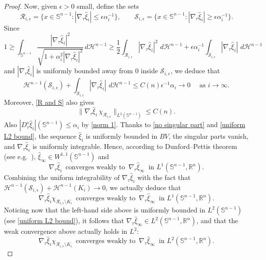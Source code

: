 \documentclass[reqno,11pt]{amsart}
\def\ez{\epsilon}
\numberwithin{equation}{section}
\theoremstyle{remark}
\begin{document}
\begin{proof}
Now, given  $\ez>0$ small, define the sets
$$\mathcal R_{i,\ez}=\{x\in \mathbb S^{n-1}\colon |\nabla_\tau \hat \xi_i|\le \ez\alpha_i^{-1}\}, \qquad \mathcal S_{i,\ez}=\{x\in \mathbb S^{n-1}\colon |\nabla_\tau \hat \xi_i|\ge \ez\alpha_i^{-1}\}.$$
Since
\begin{equation}\label{R and S}
  1\ge  \int_{\mathbb S^{n-1}}  \frac{|\nabla_\tau \hat \xi_i|^2}{\sqrt{1+ \alpha_i^2|\nabla_\tau \hat \xi_i|^2}} \,d\mathscr H^{n-1}\ge \frac 1 2 \int_{\mathcal R_{i,\ez}} |\nabla_\tau \hat \xi_i|^2\, \,d\mathscr H^{n-1} +\ez \alpha_i^{-1} \int_{\mathcal S_{i,\ez}} |\nabla_\tau \hat \xi_i|\, \,d\mathscr H^{n-1}
\end{equation} 
and $|\nabla_\tau \hat \xi_i|$ is uniformly bounded away from $0$ inside $\mathcal S_{i,\ez}$, we deduce that 
\begin{equation}\label{no singular part}
\mathscr H^{n-1}(\mathcal S_{i,\ez})+  \int_{\mathcal S_{i,\ez}} |\nabla_\tau \hat \xi_i|\, \,d\mathscr H^{n-1}\le C(n) \ez^{-1}\alpha_i \to 0 \quad \text{ as }i \to \infty. 
\end{equation}
Moreover, \eqref{R and S} also gives
\begin{equation}\label{uniform L2 bound}
    \|\nabla_\tau \hat \xi_i\,\chi_{\mathcal R_{i,\ez}}\|_{L^2(\mathbb S^{n-1})}\le C(n).
\end{equation} 
Also $|D^s_\tau\hat\xi_i|(\mathbb S^{n-1})\le \alpha_i$ by \eqref{norm 1}.
Thanks to  \eqref{no singular part} and \eqref{uniform L2 bound}, the sequence
$\hat \xi_i$ is uniformly bounded in $BV$, the singular parts vanish, and
$\nabla_\tau \hat \xi_i$ is uniformly integrable. Hence, according to Dunford--Pettis theorem (see e.g.\ \cite{B1981}), $\hat {\xi}_\infty \in W^{1,1}(\mathbb S^{n-1})$ and 
$$\nabla_\tau \hat \xi_i  \, \text{ converges weakly to } \, \nabla_\tau \hat {\xi}_\infty \ \text{ in $L^1(\mathbb S^{n-1}, \mathbb  R^n)$}.$$
Combining the uniform integrability of $\nabla_\tau \hat \xi_i$
with the fact that $\mathscr H^{n-1}(\mathcal S_{i,\ez})+\mathscr H^{n-1}(K_i)\to 0$, we actually deduce that 
$$\nabla_\tau \hat \xi_i \chi_{\mathcal R_{i,\ez}\setminus K_i} \, \text{ converges weakly to } \, \nabla_\tau \hat {\xi}_\infty \ \text{ in $L^1(\mathbb S^{n-1}, \mathbb  R^n)$}.$$
Noticing now that the left-hand side above is uniformly bounded in $L^2(\mathbb S^{n-1})$ (see \eqref{uniform L2 bound}), it follows that $\nabla_\tau \hat {\xi}_\infty \in L^2(\mathbb S^{n-1}, \mathbb  R^n)$, and that the weak convergence above actually holds in $L^2$:
$$\nabla_\tau \hat \xi_i\chi_{\mathcal R_{i,\ez}\setminus K_i}    \, \text{ converges weakly to } \, \nabla_\tau \hat {\xi}_\infty\ \text{ in } L^2(\mathbb S^{n-1}, \mathbb  R^n).$$

\end{proof}
\end{document}
